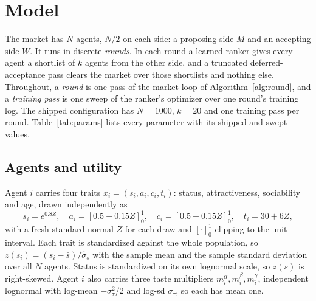 
\section{Model}
\label{sec:model}

The market has $N$ agents, $N/2$ on each side: a proposing side $M$ and an
accepting side $W$. It runs in discrete \emph{rounds}. In each round a learned
ranker gives every agent a shortlist of $k$ agents from the other side, and a
truncated deferred-acceptance pass clears the market over those shortlists and
nothing else. Throughout, a \emph{round} is one pass of the market loop of
Algorithm~\ref{alg:round}, and a \emph{training pass} is one sweep of the
ranker's optimizer over one round's training log. The shipped configuration has
$N = 1000$, $k = 20$ and one training pass per round. Table~\ref{tab:params}
lists every parameter with its shipped and swept values.

\subsection{Agents and utility}
\label{sec:utility}

Agent $i$ carries four traits $x_i = (s_i, a_i, c_i, t_i)$: status,
attractiveness, sociability and age, drawn independently as
\begin{equation}
s_i = e^{0.8 Z}, \quad a_i = [0.5 + 0.15 Z]_0^1, \quad
c_i = [0.5 + 0.15 Z]_0^1, \quad t_i = 30 + 6 Z,
\label{eq:traits}
\end{equation}
with a fresh standard normal $Z$ for each draw and $[\cdot]_0^1$ clipping to the
unit interval. Each trait is standardized against the whole population, so
$z(s_i) = (s_i - \bar s)/\hat\sigma_s$ with the sample mean and the sample
standard deviation over all $N$ agents. Status is standardized on its own
lognormal scale, so $z(s)$ is right-skewed. Agent $i$ also carries three taste
multipliers $m^{\alpha}_i, m^{\beta}_i, m^{\gamma}_i$, independent lognormal with
log-mean $-\sigma_\tau^2/2$ and log-sd $\sigma_\tau$, so each has mean one.

